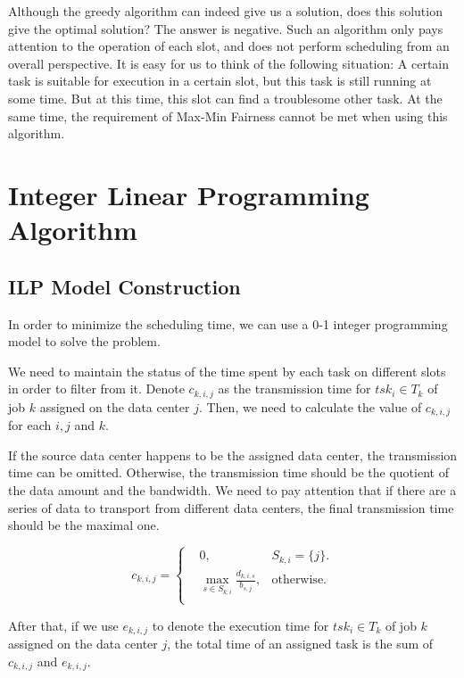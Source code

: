 \documentclass{llncs}
\begin{document}
Although the greedy algorithm can indeed give us a solution, does this solution give the optimal solution? The answer is negative. Such an algorithm only pays attention to the operation of each slot, and does not perform scheduling from an overall perspective. It is easy for us to think of the following situation: A certain task is suitable for execution in a certain slot, but this task is still running at some time. But at this time, this slot can find a troublesome other task. 
At the same time, the requirement of Max-Min Fairness cannot be met when using this algorithm.

\section{Integer Linear Programming Algorithm}

\subsection{ILP Model Construction}
In order to minimize the scheduling time, we can use a 0-1 integer programming model\cite{ref_article1} to solve the problem. 

We need to maintain the status of the time spent by each task on different slots in order to filter from it. Denote $ c_{k,i,j} $ as the transmission time for $ tsk_{i} \in T_k $ of job $ k $ assigned on the data center $ j $. Then, we need to calculate the value of $ c_{k,i,j} $ for each $ i, j $ and $ k $. 

If the source data center happens to be the assigned data center, the transmission time can be omitted. Otherwise, the transmission time should be the quotient of the data amount and the bandwidth. We need to pay attention that if there are a series of data to transport from different data centers, the final transmission time should be the maximal one.  

$$ c_{k,i,j}=\left\{
\begin{aligned}
&0, &S_{k,i} = \{j\}. \\
&\max\limits_{s \in S_{k,i}} \frac{d_{k,i,s}}{b_{s,j}}, &\textrm{otherwise}.\\
\end{aligned}
\right.
$$

After that, if we use $ e_{k,i,j} $ to denote the execution time for $ tsk_{i} \in T_k $ of job $ k $ assigned on the data center $ j $, the total time of an assigned task is the sum of $ c_{k,i,j} $ and $ e_{k,i,j} $. 
\end{document}

